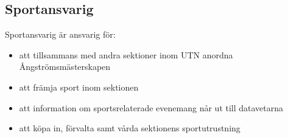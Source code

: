 \documentclass[a4paper]{article}
\begin{document}
  \subsection{Sportansvarig}
  Sportansvarig är ansvarig för:

  \begin{itemize}
    \item att tillsammans med andra sektioner inom UTN anordna Ångströmsmästerskapen
    \item att främja sport inom sektionen
    \item att information om sportsrelaterade evenemang når ut till datavetarna
    \item att köpa in, förvalta samt vårda sektionens sportutrustning
  \end{itemize}
\end{document}
